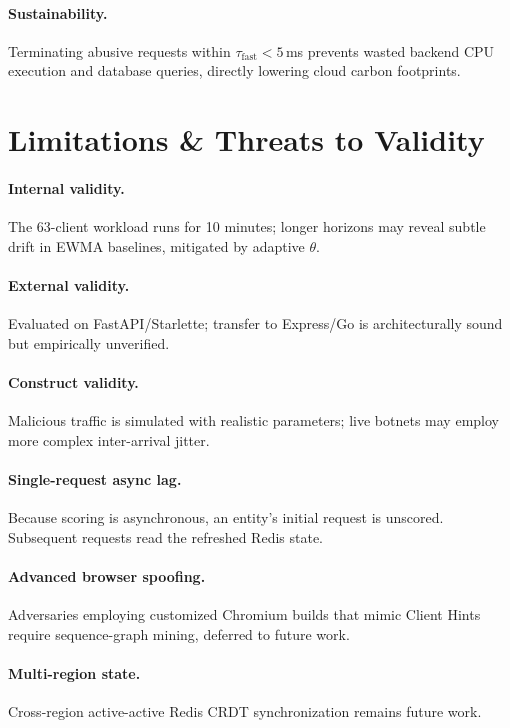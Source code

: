 \documentclass[journal,10pt]{IEEEtran}
\newcommand{\Tfast}{\tau_{\mathrm{fast}}}
\begin{document}
\begin{table}[!t]
\paragraph{Sustainability.} Terminating abusive requests within $\Tfast<5$\,ms prevents wasted backend CPU execution and database queries, directly lowering cloud carbon footprints.

\section{Limitations \& Threats to Validity}
\label{sec:limits}

\paragraph{Internal validity.} The 63-client workload runs for 10 minutes; longer horizons may reveal subtle drift in EWMA baselines, mitigated by adaptive $\theta$.

\paragraph{External validity.} Evaluated on FastAPI/Starlette; transfer to Express/Go is architecturally sound but empirically unverified.

\paragraph{Construct validity.} Malicious traffic is simulated with realistic parameters; live botnets may employ more complex inter-arrival jitter.

\paragraph{Single-request async lag.} Because scoring is asynchronous, an entity's initial request is unscored. Subsequent requests read the refreshed Redis state.

\paragraph{Advanced browser spoofing.} Adversaries employing customized Chromium builds that mimic Client Hints require sequence-graph mining, deferred to future work.

\paragraph{Multi-region state.} Cross-region active-active Redis CRDT synchronization remains future work.


\end{table}
\end{document}
